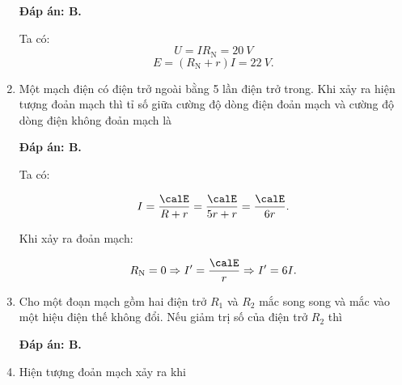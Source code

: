 \begin{enumerate}[label=\bfseries Câu \arabic*:]
	\hideall
	{		\textbf{Đáp án: B.}
		
		Ta có: $$U = IR_\text{N} = \SI{20}{V}$$
		$$E = (R_\text{N} + r)I = \SI{22}{V}.$$
		
	}
	\item {}
	
	
	{Một mạch điện có điện trở ngoài bằng 5 lần điện trở trong. Khi xảy ra hiện tượng đoản mạch thì tỉ số giữa cường độ dòng điện đoản mạch và cường độ dòng điện không đoản mạch là
	}
	
	\hideall
	{		\textbf{Đáp án: B.}
		
		Ta có:
		
		$$I = \dfrac{\calE}{R+r} = \dfrac{\calE}{5r+r} = \dfrac{\calE}{6r}.$$
		
		Khi xảy ra đoản mạch:
		
		$$R_\text{N} = 0 \Rightarrow I' = \dfrac{\calE}{r} \Rightarrow I' =6I.$$
		
		
		
	}
	
	\item {}
	
	
	{Cho một đoạn mạch gồm hai điện trở $R_1$ và $R_2$ mắc song song và mắc vào một hiệu điện thế không đổi. Nếu giảm trị số của điện trở $R_2$ thì
	}
	
	\hideall
	{		\textbf{Đáp án: B.}
		
		
		
	}
	\item {}
	
	
	{Hiện tượng đoản mạch xảy ra khi
	}
	

\end{enumerate}
